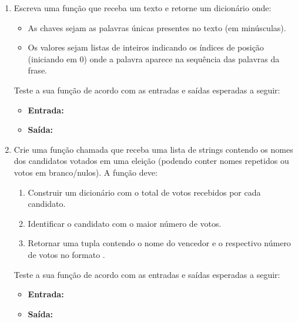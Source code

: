 \begin{enumerate}[label=\textbf{Q\arabic*.}]



\item Escreva uma função  que receba um texto e retorne um dicionário onde:
\begin{itemize}
    \item As chaves sejam as palavras únicas presentes no texto (em minúsculas).
    \item Os valores sejam listas de inteiros indicando os índices de posição (iniciando em 0) onde a palavra aparece na sequência das palavras da frase.
\end{itemize}
Teste a sua função de acordo com as entradas e saídas esperadas a seguir:
\begin{itemize}
    \item \textbf{Entrada:} 
    \item \textbf{Saída:} \\
\end{itemize}




\item Crie uma função chamada  que receba uma lista de strings contendo os nomes dos candidatos votados em uma eleição (podendo conter nomes repetidos ou votos em branco/nulos). A função deve:
\begin{enumerate}[label=\alph*)]
    \item Construir um dicionário com o total de votos recebidos por cada candidato.
    \item Identificar o candidato com o maior número de votos.
    \item Retornar uma tupla contendo o nome do vencedor e o respectivo número de votos no formato .
\end{enumerate}

Teste a sua função de acordo com as entradas e saídas esperadas a seguir:
\begin{itemize}
    \item \textbf{Entrada:} 
    \item \textbf{Saída:} 
\end{itemize}



\end{enumerate}